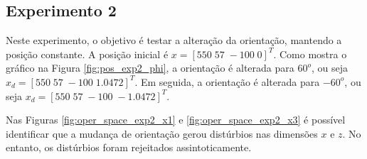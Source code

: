 \subsection{Experimento 2}

Neste experimento, o objetivo é testar a alteração da orientação, mantendo a posição constante. A posição inicial é ${x} =[ 550 \; 57 \; -100 \; 0]^T$. Como mostra o gráfico na Figura \ref{fig:pos_exp2_phi}, a orientação é alterada para $60^o$, ou seja ${x_d} =[ 550 \; 57 \; -100 \; 1.0472]^T$. Em seguida, a orientação é alterada para $-60^o$, ou seja ${x_d} =[ 550 \; 57 \; -100 \; -1.0472]^T$. 

Nas Figuras \ref{fig:oper_space_exp2_x1} e \ref{fig:oper_space_exp2_x3} é possível identificar que a mudança de orientação gerou distúrbios nas dimensões $x$ e $z$. No entanto, os distúrbios foram rejeitados assintoticamente.

